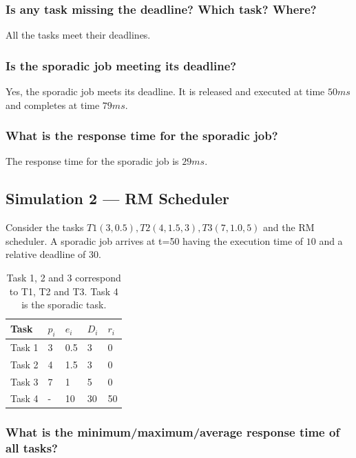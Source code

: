 \documentclass[a4paper]{article}
\begin{document}
\subsubsection{Is any task missing the deadline? Which task? Where?}
All the tasks meet their deadlines.

\subsubsection{Is the sporadic job meeting its deadline?}
Yes, the sporadic job meets its deadline. It is released and executed at time $50ms$ and completes at time $79ms$.

\subsubsection{What is the response time for the sporadic job?}
The response time for the sporadic job is $29ms$.

\newpage

\subsection{Simulation 2 --- RM Scheduler}

Consider the tasks $T1(3, 0.5), T2(4, 1.5, 3), T3(7, 1.0, 5)$ and the RM scheduler. A sporadic job arrives at t=50 having the execution time of $10$ and a relative deadline of $30$.

\begin{table}[!htbp]
\begin{center}
\begin{tabular}{|l||l|l|l|l|}
\hline
Task   & $p_i$ & $e_i$ & $D_i$ & $r_i$\\
\hline
\hline
Task 1 & 3 & 0.5 & 3 & 0\\
\hline
Task 2 & 4 & 1.5 & 3 & 0\\
\hline
Task 3 & 7 & 1 & 5 & 0\\
\hline
Task 4 & - & 10 & 30 & 50 \\
\hline
\end{tabular}
\caption{Task 1, 2 and 3 correspond to T1, T2 and T3. Task 4 is the sporadic task.}
\end{center}
\end{table}

\subsubsection{What is the minimum/maximum/average response time of all tasks?}
\end{document}

